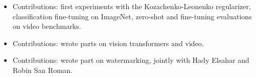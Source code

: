 {\footnotesize
{}
\begin{itemize}
    \item {}
    \begin{spacing}{1.0}
        \scriptsize Contributions: first experiments with the Kozachenko-Leonenko regularizer, classification fine-tuning on ImageNet, zero-shot and fine-tuning evaluations on video benchmarks.
    \end{spacing}
    \item {}
    \begin{spacing}{1.0}
        \scriptsize Contributions: wrote parts on vision transformers and video.
    \end{spacing}
    \item {} 
    \begin{spacing}{1.0}
        \scriptsize Contributions: wrote part on watermarking, jointly with Hady Elsahar and Robin San Roman.
    \end{spacing}
\end{itemize}
}
